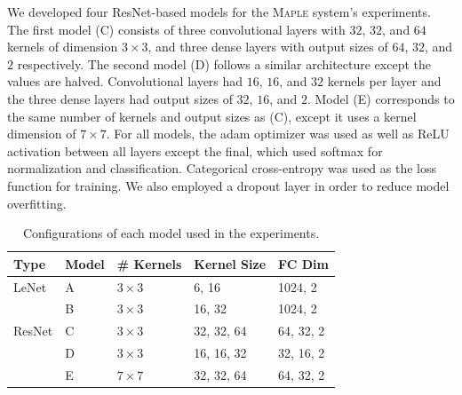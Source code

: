We developed four ResNet-based models for the \textsc{Maple} system's experiments. The first model (C) consists of three convolutional layers with $32$, $32$, and $64$ kernels of dimension $3\times3$, and three dense layers with output sizes of $64$, $32$, and $2$ respectively. The second model (D) follows a similar architecture except the values are halved. Convolutional layers had $16$, $16$, and $32$ kernels per layer and the three dense layers had output sizes of $32$, $16$, and $2$. Model (E) corresponds to the same number of kernels and output sizes as (C), except it uses a kernel dimension of $7\times7$. For all models, the adam optimizer was used as well as ReLU activation between all layers except the final, which used softmax for normalization and classification. Categorical cross-entropy was used as the loss function for training. We also employed a dropout layer in order to reduce model overfitting.

\begin{table} [h!]
\centering
\begin{tabular}{| l | l | l | l | l |}
\hline
Type & Model & \# Kernels & Kernel Size & FC Dim \\
\hline
LeNet & A & $3\times3$ & 6, 16 & 1024, 2 \\
\cline{2-5}
& B & $3\times3$ & 16, 32 & 1024, 2 \\
\hline
ResNet & C & $3\times3$ & 32, 32, 64 & 64, 32, 2 \\
\cline{2-5}
& D & $3\times3$ & 16, 16, 32 & 32, 16, 2 \\
\cline{2-5}
& E & $7\times7$ & 32, 32, 64 & 64, 32, 2 \\
\cline{2-5}
\hline
\end{tabular}
\caption{Configurations of each model used in the experiments.}
\label{table:attacks}
\end{table}
